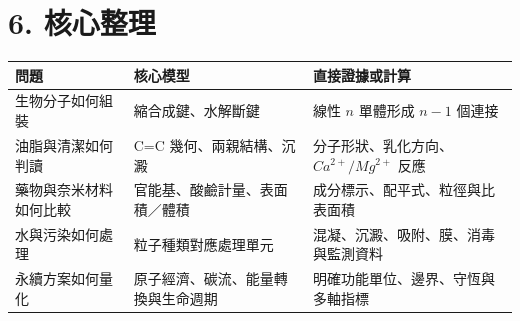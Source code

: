 \documentclass[11pt,a4paper]{article}
\newcounter{none}
\begin{document}
\section{6. 核心整理}\label{ux6838ux5fc3ux6574ux7406}

{\def\LTcaptype{none} %
\begin{longtable}[]{@{}
  >{\raggedright\arraybackslash}p{}
  >{\raggedright\arraybackslash}p{}
  >{\raggedright\arraybackslash}p{}@{}}
\toprule\noalign{}
\begin{minipage}[b]{\linewidth}\raggedright
問題
\end{minipage} & \begin{minipage}[b]{\linewidth}\raggedright
核心模型
\end{minipage} & \begin{minipage}[b]{\linewidth}\raggedright
直接證據或計算
\end{minipage} \\
\midrule\noalign{}
\endhead
\bottomrule\noalign{}
\endlastfoot
生物分子如何組裝 & 縮合成鍵、水解斷鍵 & 線性 \(n\) 單體形成 \(n-1\) 個連接 \\
油脂與清潔如何判讀 & C=C 幾何、兩親結構、沉澱 & 分子形狀、乳化方向、\(Ca^{2+}/Mg^{2+}\) 反應 \\
藥物與奈米材料如何比較 & 官能基、酸鹼計量、表面積／體積 & 成分標示、配平式、粒徑與比表面積 \\
水與污染如何處理 & 粒子種類對應處理單元 & 混凝、沉澱、吸附、膜、消毒與監測資料 \\
永續方案如何量化 & 原子經濟、碳流、能量轉換與生命週期 & 明確功能單位、邊界、守恆與多軸指標 \\
\end{longtable}
}
\end{document}
